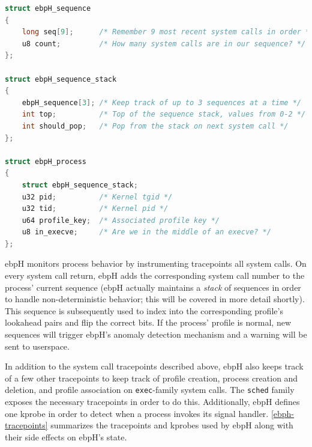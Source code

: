 \documentclass[
  12pt]{findlay}
\newcommand{\passthrough}[1]{#1}
\begin{document}
\begin{lstlisting}[language=c, label={ebph-process-struct}, caption={A simplified
definition of the ebpH process struct.}]
struct ebpH_sequence
{
    long seq[9];      /* Remember 9 most recent system calls in order */
    u8 count;         /* How many system calls are in our sequence? */
};

struct ebpH_sequence_stack
{
    ebpH_sequence[3]; /* Keep track of up to 3 sequences at a time */
    int top;          /* Top of the sequence stack, values from 0-2 */
    int should_pop;   /* Pop from the stack on next system call */
};

struct ebpH_process
{
    struct ebpH_sequence_stack;
    u32 pid;          /* Kernel tgid */
    u32 tid;          /* Kernel pid */
    u64 profile_key;  /* Associated profile key */
    u8 in_execve;     /* Are we in the middle of an execve? */
};
\end{lstlisting}

ebpH monitors process behavior by instrumenting tracepoints all system
calls. On every system call return, ebpH adds the corresponding system
call number to the process' current sequence (ebpH actually maintains a
\emph{stack} of sequences in order to handle non-deterministic behavior;
this will be covered in more detail shortly). This sequence is
subsequently used to index into the corresponding profile's lookahead
pairs and flip the correct bits. If the process' profile is normal, new
sequences will trigger ebpH's anomaly detection mechanism and a warning
will be sent to userspace.

In addition to the system call tracepoints described above, ebpH also
keeps track of a few other tracepoints to keep track of profile
creation, process creation and deletion, and profile association on
\passthrough{\lstinline!exec!}-family system calls. The
\passthrough{\lstinline!sched!} family exposes the necessary tracepoints
in order to do this. Additionally, ebpH defines one kprobe in order to
detect when a process invokes its signal handler.
\autoref{ebph-tracepoints} summarizes the tracepoints and kprobes used
by ebpH along with their side effects on ebpH's state.
\end{document}

